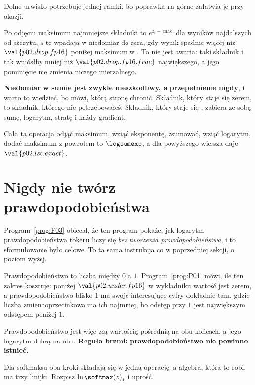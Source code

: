\begin{fr}
Dolne urwisko potrzebuje jednej ramki, bo poprawka na górne załatwia je przy
okazji.

Po odjęciu maksimum najmniejsze składniki to $e^{z_i - \max}$ dla wyników
najdalszych od szczytu, a te wpadają w niedomiar do zera, gdy wynik spadnie
więcej niż $\val{p02.drop.fp16}$ poniżej maksimum w . To nie jest
awaria: taki składnik i tak wniósłby mniej niż $\val{p02.drop.fp16.frac}$
największego, a jego pominięcie nie zmienia niczego mierzalnego.

\textbf{Niedomiar w sumie jest zwykle nieszkodliwy, a przepełnienie nigdy}, i
warto to wiedzieć, bo mówi, którą stronę chronić. Składnik, który staje się
zerem, to składnik, którego nie potrzebowałeś. Składnik, który staje się
, zabiera ze sobą sumę, logarytm, stratę i każdy gradient.

Cała ta operacja \dash{} odjąć maksimum, wziąć eksponentę, zsumować, wziąć
logarytm, dodać maksimum z powrotem \dash{} to $\logsumexp$, a dla powyższego
wiersza daje $\val{p02.lse.exact}$.
\end{fr}

\section{Nigdy nie twórz prawdopodobieństwa}
\label{sec:P02-logits}

\begin{fr}
Program~\ref{prog:F03} obiecał, że ten program pokaże, jak logarytm
prawdopodobieństwa tokenu liczy się \emph{bez tworzenia prawdopodobieństwa}, i
to sformułowanie było celowe. To ta sama instrukcja co w poprzedniej sekcji, o
poziom wyżej.

Prawdopodobieństwo to liczba między $0$ a $1$. Program~\ref{prog:P01} mówi, ile
ten zakres kosztuje: poniżej $\val{p02.under.fp16}$ w wykładniku wartość
 jest zerem, a prawdopodobieństwo blisko $1$ ma swoje interesujące
cyfry dokładnie tam, gdzie liczba zmiennoprzecinkowa ma ich najmniej, bo odstęp
przy $1$ jest największym odstępem poniżej $1$.

Prawdopodobieństwo jest więc złą wartością pośrednią na obu końcach, a jego
logarytm dobrą na obu. \textbf{Reguła brzmi: prawdopodobieństwo nie powinno
istnieć.}

Dla softmaksu oba kroki składają się w jedną operację, a algebra, która to
robi, ma trzy linijki. Rozpisz $\ln \softmax(z)_j$ i uprość.
\dotline
\nextframe
\end{fr}

